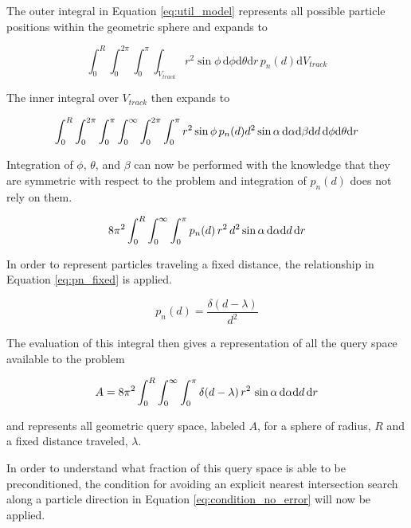 The outer integral in Equation \ref{eq:util_model} represents all possible particle
positions within the geometric sphere and expands to

\begin{equation}
\int_{0}^{R}\int_{0}^{2\pi}\int_{0}^{\pi}\int_{V_{track}} r^2\sin{\phi} \, \mathrm{d}\phi
\mathrm{d}\theta \mathrm{d}r \,  p_n(d) \mathrm{d}V_{track}
\end{equation}

The inner integral over $V_{track}$ then expands to

\begin{equation}
\small \int_{0}^{R}\int_{0}^{2\pi}\int_{0}^{\pi}\int_{0}^{\infty}\int_{0}^{2\pi}\int_{0}^{\pi}
r^2\sin{\phi} \, p_n(d) d^2 \sin{\alpha} \, \mathrm{d}\alpha \mathrm{d}\beta \mathrm{d}d \, \mathrm{d}\phi
\mathrm{d}\theta \mathrm{d}r
\end{equation}

Integration of $\phi$, $\theta$, and $\beta$ can now be performed with
the knowledge that they are symmetric with respect to the problem and
integration of $p_n(d)$ does not rely on them.

\begin{equation}
\small 8\pi^2  \int_{0}^{R}\int_{0}^{\infty}\int_{0}^{\pi} p_n(d) \,
r^2 \, d^2 \sin{\alpha} \, \mathrm{d}\alpha \mathrm{d}d \, \mathrm{d}r
\end{equation}

In order to represent particles traveling a fixed distance, the relationship in Equation \ref{eq:pn_fixed}
is applied.

\begin{equation}
  \label{eq:pn_fixed}
  p_n(d) = \frac{\delta(d-\lambda)}{d^{2}}
\end{equation}

The evaluation of this integral then gives a representation of all the query
space available to the problem

\begin{equation}
  \label{eq:A_fixed}
\small A = 8\pi^2  \int_{0}^{R}\int_{0}^{\infty}\int_{0}^{\pi} \delta(d-\lambda) \,
r^2 \, \sin{\alpha} \, \mathrm{d}\alpha \mathrm{d}d \, \mathrm{d}r
\end{equation}

and represents all geometric query space, labeled $A$, for a sphere of radius,
$R$ and a fixed distance traveled, $\lambda$.

In order to understand what fraction of this query space is able to be
preconditioned, the condition for avoiding an explicit nearest intersection
search along a particle direction in Equation \ref{eq:condition_no_error} will now be
applied.

